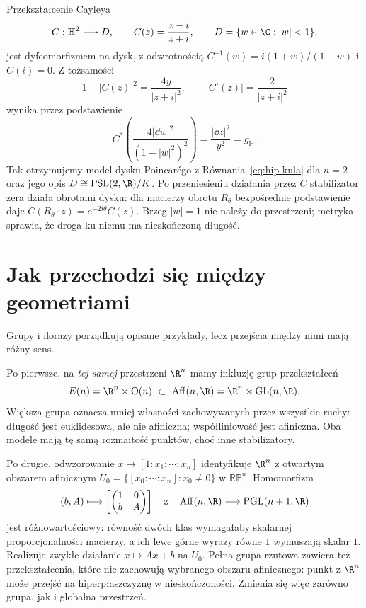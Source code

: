 \begin{przyklad}
Przekształcenie Cayleya
\[
 C:\mathbb H^2\longrightarrow D,
 \qquad C(z)=\frac{z-i}{z+i},\qquad
 D=\{w\in\C:|w|<1\},
\]
jest dyfeomorfizmem na dysk, z odwrotnością
$C^{-1}(w)=i(1+w)/(1-w)$ i $C(i)=0$.
Z tożsamości
\[
 1-|C(z)|^2=\frac{4y}{|z+i|^2},
 \qquad |C'(z)|=\frac2{|z+i|^2}
\]
wynika przez podstawienie
\[
 C^*\!\left(\frac{4|\dd w|^2}{(1-|w|^2)^2}\right)
 =\frac{|\dd z|^2}{y^2}=g_{\mathbb H}.
\]
Tak otrzymujemy model dysku Poincarégo z
Równania~\eqref{eq:hip-kula} dla $n=2$ oraz jego
opis $D\cong\mathrm{PSL}(2,\R)/K$.
Po przeniesieniu działania przez $C$ stabilizator
zera działa obrotami dysku: dla macierzy obrotu $R_\theta$
bezpośrednie podstawienie daje
$C(R_\theta\cdot z)=e^{-2i\theta}C(z)$.
Brzeg $|w|=1$ nie należy
do przestrzeni; metryka sprawia, że droga ku niemu
ma nieskończoną długość.
\end{przyklad}

\section{Jak przechodzi się między geometriami}
\label{sec:klein-przejscia}

Grupy i ilorazy porządkują opisane przykłady, lecz
przejścia między nimi mają różny sens.

Po pierwsze, na \emph{tej samej} przestrzeni $\R^n$ mamy
inkluzję grup przekształceń
\[
 E(n)=\R^n\rtimes\mathrm O(n)
 \ \subset\ \operatorname{Aff}(n,\R)
 =\R^n\rtimes\mathrm{GL}(n,\R).
\]
Większa grupa oznacza mniej własności zachowywanych przez
wszystkie ruchy: długość jest euklidesowa, ale nie afiniczna;
współliniowość jest afiniczna. Oba modele mają tę samą
rozmaitość punktów, choć inne stabilizatory.

Po drugie, odwzorowanie $x\mapsto[1:x_1:\cdots:x_n]$
identyfikuje $\R^n$ z otwartym obszarem afinicznym
$U_0=\{[x_0:\cdots:x_n]:x_0\ne0\}$ w $\mathbb{RP}^n$.
Homomorfizm
\[
 (b,A)\longmapsto
 \left[\begin{pmatrix}1&0\\b&A\end{pmatrix}\right]
 \quad\text{z}\quad
 \operatorname{Aff}(n,\R)
 \longrightarrow\mathrm{PGL}(n+1,\R)
\]
jest różnowartościowy: równość dwóch klas wymagałaby
skalarnej proporcjonalności macierzy, a ich lewe górne
wyrazy równe $1$ wymuszają skalar $1$.
Realizuje zwykłe działanie
$x\mapsto Ax+b$ na $U_0$. Pełna grupa rzutowa
zawiera też przekształcenia, które nie zachowują
wybranego obszaru afinicznego: punkt z $\R^n$ może przejść
na hiperpłaszczyznę w nieskończoności. Zmienia się więc
zarówno grupa, jak i globalna przestrzeń.

